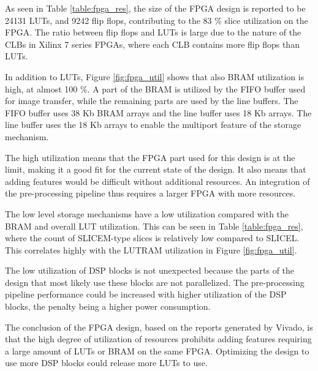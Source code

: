 \documentclass[12pt]{report}
\begin{document}
As seen in Table \ref*{table:fpga_res}, the size of the FPGA design is reported to be 24131 LUTs, and 9242 flip flops, contributing to the 83 \% slice utilization on the FPGA. The ratio between flip flops and LUTs is large due to the nature of the CLBs in Xilinx 7 series FPGAs, where each CLB contains more flip flops than LUTs.
\par
In addition to LUTs, Figure \ref*{fig:fpga_util} shows that also BRAM utilization is high, at almost 100 \%. A part of the BRAM is utilized by the FIFO buffer used for image transfer, while the remaining parts are used by the line buffers. The FIFO buffer uses 38 Kb BRAM arrays and the line buffer uses 18 Kb arrays. The line buffer uses the 18 Kb arrays to enable the multiport feature of the storage mechanism.
\par
The high utilization means that the FPGA part used for this design is at the limit, making it a good fit for the current state of the design. It also means that adding features would be difficult without additional resources. An integration of the pre-processing pipeline thus requires a larger FPGA with more resources.
\par
The low level storage mechanisms have a low utilization compared with the BRAM and overall LUT utilization. This can be seen in Table \ref*{table:fpga_res}, where the count of SLICEM-type slices is relatively low compared to SLICEL. This correlates highly with the LUTRAM utilization in Figure \ref*{fig:fpga_util}.
\par
The low utilization of DSP blocks is not unexpected because the parts of the design that most likely use these blocks are not parallelized. The pre-processing pipeline performance could be increased with higher utilization of the DSP blocks, the penalty being a higher power consumption. 
\par
The conclusion of the FPGA design, based on the reports generated by Vivado, is that the high degree of utilization of resources prohibits adding features requiring a large amount of LUTs or BRAM on the same FPGA. Optimizing the design to use more DSP blocks could release more LUTs to use.
 



\end{document}
